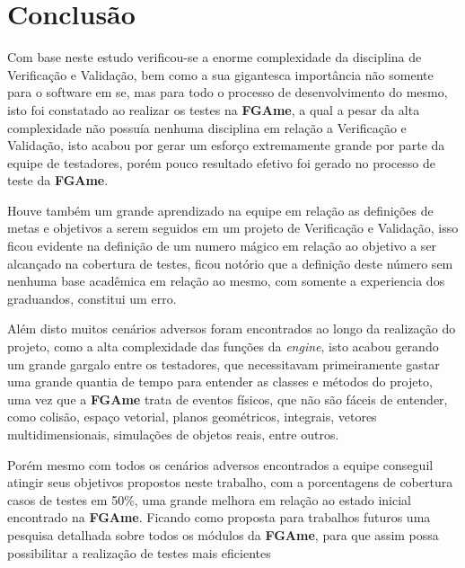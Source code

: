 \chapter{Conclusão}

Com base neste estudo verificou-se a enorme complexidade da disciplina de Verificação e Validação, bem como a sua gigantesca importância não somente para o software em se, mas para todo o processo de desenvolvimento do mesmo, isto foi constatado ao realizar os testes na \textbf{FGAme}, a qual a pesar da alta complexidade não possuía nenhuma disciplina em relação a Verificação e Validação, isto acabou por gerar um esforço extremamente grande por parte da equipe de testadores, porém pouco resultado efetivo foi gerado no processo de teste da \textbf{FGAme}.

Houve também um grande aprendizado na equipe em relação as definições de metas e objetivos a serem seguidos em um projeto de Verificação e Validação, isso ficou evidente na definição de um numero mágico em relação ao objetivo a ser alcançado na cobertura de testes, ficou notório que a definição deste número sem nenhuma base acadêmica em relação ao mesmo, com somente a experiencia dos graduandos, constitui um erro.

Além disto muitos cenários adversos foram encontrados ao longo da realização do projeto, como a alta complexidade das funções da \textit{engine}, isto acabou gerando um grande gargalo entre os testadores, que necessitavam primeiramente gastar uma grande quantia de tempo para entender as classes e métodos do projeto, uma vez que a \textbf{FGAme} trata de eventos físicos, que não são fáceis de entender, como colisão, espaço vetorial, planos geométricos, integrais, vetores multidimensionais, simulações de objetos reais, entre outros.

Porém mesmo com todos os cenários adversos encontrados a equipe conseguil atingir seus objetivos propostos neste trabalho, com a porcentagens de cobertura casos de testes em 50\%, uma grande melhora em relação ao estado inicial encontrado na \textbf{FGAme}. Ficando como proposta para trabalhos futuros uma pesquisa detalhada sobre todos os módulos da \textbf{FGAme}, para que assim possa possibilitar a realização de testes mais eficientes